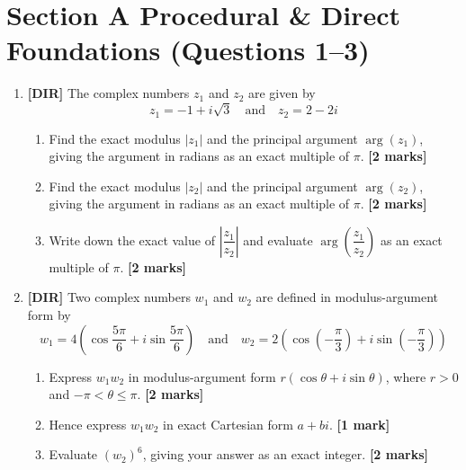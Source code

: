 \documentclass[11pt,a4paper]{article}
\begin{document}
\thispagestyle{plain}


\section*{Section A \quad Procedural \& Direct Foundations \hfill{\normalfont\footnotesize(Questions 1--3)}}
\begin{enumerate}

\item \textbf{[DIR]} The complex numbers $z_1$ and $z_2$ are given by
\[
z_1 = -1 + i\sqrt{3} \quad \text{and} \quad z_2 = 2 - 2i
\]
\begin{enumerate}[label=(\alph*)]
  \item Find the exact modulus $|z_1|$ and the principal argument $\arg(z_1)$, giving the argument in radians as an exact multiple of $\pi$. \hfill{\textbf{[2 marks]}}
  \item Find the exact modulus $|z_2|$ and the principal argument $\arg(z_2)$, giving the argument in radians as an exact multiple of $\pi$. \hfill{\textbf{[2 marks]}}
  \item Write down the exact value of $\left|\dfrac{z_1}{z_2}\right|$ and evaluate $\arg\left(\dfrac{z_1}{z_2}\right)$ as an exact multiple of $\pi$. \hfill{\textbf{[2 marks]}}
\end{enumerate}

\item \textbf{[DIR]} Two complex numbers $w_1$ and $w_2$ are defined in modulus-argument form by
\[
w_1 = 4\left(\cos\frac{5\pi}{6} + i\sin\frac{5\pi}{6}\right) \quad \text{and} \quad w_2 = 2\left(\cos\left(-\frac{\pi}{3}\right) + i\sin\left(-\frac{\pi}{3}\right)\right)
\]
\begin{enumerate}[label=(\alph*)]
  \item Express $w_1 w_2$ in modulus-argument form $r(\cos\theta + i\sin\theta)$, where $r > 0$ and $-\pi < \theta \le \pi$. \hfill{\textbf{[2 marks]}}
  \item Hence express $w_1 w_2$ in exact Cartesian form $a + bi$. \hfill{\textbf{[1 mark]}}
  \item Evaluate $(w_2)^6$, giving your answer as an exact integer. \hfill{\textbf{[2 marks]}}
\end{enumerate}


\end{enumerate}
\end{document}
